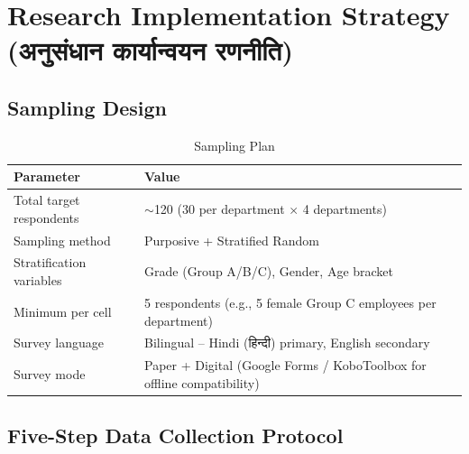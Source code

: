\documentclass[12pt,a4paper]{article}
\newcommand{\hindi}[1]{{\hindifont #1}}
\begin{document}
\section{Research Implementation Strategy (\hindi{अनुसंधान कार्यान्वयन रणनीति})}

\subsection{Sampling Design}

\begin{table}[H]
\centering
\caption{Sampling Plan}
\label{tab:sampling}
\begin{tabularx}{\textwidth}{@{}lX@{}}
\toprule
\textbf{Parameter} & \textbf{Value} \\
\midrule
Total target respondents & $\sim$120 (30 per department $\times$ 4 departments) \\
Sampling method & Purposive + Stratified Random \\
Stratification variables & Grade (Group A/B/C), Gender, Age bracket \\
Minimum per cell & 5 respondents (e.g., 5 female Group C employees per department) \\
Survey language & Bilingual -- Hindi (\hindi{हिन्दी}) primary, English secondary \\
Survey mode & Paper + Digital (Google Forms / KoboToolbox for offline compatibility) \\
\bottomrule
\end{tabularx}
\end{table}

\subsection{Five-Step Data Collection Protocol}
\end{document}
